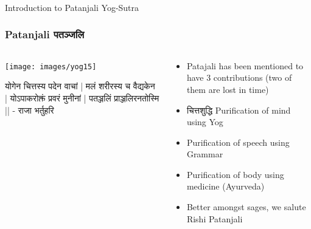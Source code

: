 \begin{frame}[fragile]\frametitle{}
\begin{center}
{\Large Introduction to Patanjali Yog-Sutra}
\end{center}
\end{frame}

 \begin{frame}[fragile]\frametitle{Patanjali  पतञ्जलि }
 
    \begin{columns}
    \begin{column}[t]{0.4\linewidth}
	
\begin{center}
\texttt{[image: images/yog15]}
\end{center}

\begin{sanskrit}
योगेन चित्तस्य पदेन वाचां |
मलं शरीरस्य च वैद्यकेन |
योऽपाकरोक्तं प्रवरं मुनीनां |
पतञ्जलिं प्राञ्जलिरनतोस्मि ||
- राजा भर्तुहरि
\end{sanskrit}

    \end{column}
    \begin{column}[t]{0.6\linewidth}
		\begin{itemize}
	\item Patajali has been mentioned to have 3 contributions (two of them are lost in time)
	\item चित्तशुद्धि Purification of mind using Yog
	\item Purification of speech using Grammar
	\item Purification of body using medicine (Ayurveda)
	\item Better amongst sages, we salute Rishi Patanjali
	\end{itemize}

    \end{column}
  \end{columns}
\end{frame}

